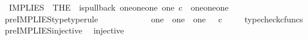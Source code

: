 \begin{isabellebody}
\ \ {\isachardoublequoteopen}IMPLIES\ {\isacharequal}{\kern0pt}\ {\isacharparenleft}{\kern0pt}THE\ {\isasymchi}{\isachardot}{\kern0pt}\ is{\isacharunderscore}{\kern0pt}pullback\ {\isacharparenleft}{\kern0pt}one{\isasymCoprod}{\isacharparenleft}{\kern0pt}one{\isasymCoprod}one{\isacharparenright}{\kern0pt}{\isacharparenright}{\kern0pt}\ one\ {\isacharparenleft}{\kern0pt}{\isasymOmega}{\isasymtimes}\isactrlsub c{\isasymOmega}{\isacharparenright}{\kern0pt}\ {\isasymOmega}\ {\isacharparenleft}{\kern0pt}{\isasymbeta}\isactrlbsub {\isacharparenleft}{\kern0pt}one{\isasymCoprod}{\isacharparenleft}{\kern0pt}one{\isasymCoprod}one{\isacharparenright}{\kern0pt}{\isacharparenright}{\kern0pt}\isactrlesub {\isacharparenright}{\kern0pt}\ {\isasymt}\ {\isacharparenleft}{\kern0pt}{\isasymlangle}{\isasymt}{\isacharcomma}{\kern0pt}\ {\isasymt}{\isasymrangle}{\isasymamalg}\ {\isacharparenleft}{\kern0pt}{\isasymlangle}{\isasymf}{\isacharcomma}{\kern0pt}\ {\isasymf}{\isasymrangle}\ {\isasymamalg}{\isasymlangle}{\isasymf}{\isacharcomma}{\kern0pt}\ {\isasymt}{\isasymrangle}{\isacharparenright}{\kern0pt}{\isacharparenright}{\kern0pt}\ {\isasymchi}{\isacharparenright}{\kern0pt}{\isachardoublequoteclose}\isanewline
\isanewline
{}\isamarkupfalse%
\ pre{\isacharunderscore}{\kern0pt}IMPLIES{\isacharunderscore}{\kern0pt}type{\isacharbrackleft}{\kern0pt}type{\isacharunderscore}{\kern0pt}rule{\isacharbrackright}{\kern0pt}{\isacharcolon}{\kern0pt}\ \isanewline
\ \ {\isachardoublequoteopen}{\isasymlangle}{\isasymt}{\isacharcomma}{\kern0pt}\ {\isasymt}{\isasymrangle}\ {\isasymamalg}\ {\isacharparenleft}{\kern0pt}{\isasymlangle}{\isasymf}{\isacharcomma}{\kern0pt}\ {\isasymf}{\isasymrangle}\ {\isasymamalg}\ {\isasymlangle}{\isasymf}{\isacharcomma}{\kern0pt}\ {\isasymt}{\isasymrangle}{\isacharparenright}{\kern0pt}\ {\isacharcolon}{\kern0pt}\ one\ {\isasymCoprod}\ {\isacharparenleft}{\kern0pt}one\ {\isasymCoprod}\ one{\isacharparenright}{\kern0pt}\ {\isasymrightarrow}\ {\isasymOmega}\ {\isasymtimes}\isactrlsub c\ {\isasymOmega}{\isachardoublequoteclose}\isanewline
%
\isadelimproof
\ \ %
\endisadelimproof
%
\isatagproof
{}\isamarkupfalse%
\ typecheck{\isacharunderscore}{\kern0pt}cfuncs%
\endisatagproof
{\isafoldproof}%
%
\isadelimproof
\isanewline
%
\endisadelimproof
\isanewline
{}\isamarkupfalse%
\ pre{\isacharunderscore}{\kern0pt}IMPLIES{\isacharunderscore}{\kern0pt}injective{\isacharcolon}{\kern0pt}\isanewline
\ \ {\isachardoublequoteopen}injective{\isacharparenleft}{\kern0pt}{\isasymlangle}{\isasymt}{\isacharcomma}{\kern0pt}\ {\isasymt}{\isasymrangle}\ {\isasymamalg}\ {\isacharparenleft}{\kern0pt}{\isasymlangle}{\isasymf}{\isacharcomma}{\kern0pt}\ {\isasymf}{\isasymrangle}\ {\isasymamalg}{\isasymlangle}{\isasymf}{\isacharcomma}{\kern0pt}\ {\isasymt}{\isasymrangle}{\isacharparenright}{\kern0pt}{\isacharparenright}{\kern0pt}{\isachardoublequoteclose}\isanewline

\end{isabellebody}
